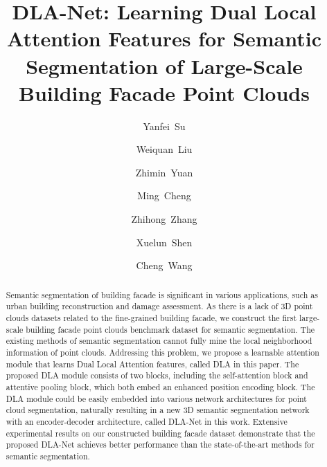 \documentclass[review]{elsarticle}
\begin{document}
\begin{frontmatter}

\title{DLA-Net: Learning Dual Local Attention Features for Semantic Segmentation of Large-Scale Building Facade Point Clouds}

\author[mymainaddress]{Yanfei~Su}
\author[mymainaddress]{Weiquan~Liu}
\author[mymainaddress]{Zhimin~Yuan}
\author[mymainaddress]{Ming~Cheng}
\author[mymainaddress]{Zhihong~Zhang}
\author[mymainaddress]{Xuelun~Shen}
\author[mymainaddress]{Cheng~Wang}

\address[mymainaddress]{Fujian Key Laboratory of Sensing and Computing for Smart City, School of Informatics, Xiamen University, Xiamen, China}



\begin{abstract}
	
Semantic segmentation of building facade is significant in various applications, such as urban building reconstruction and damage assessment. As there is a lack of 3D point clouds datasets related to the fine-grained building facade, we construct the first large-scale building facade point clouds benchmark dataset for semantic segmentation. The existing methods of semantic segmentation cannot fully mine the local neighborhood information of point clouds. Addressing this problem, we propose a learnable attention module that learns Dual Local Attention features, called DLA in this paper. The proposed DLA module consists of two blocks, including the self-attention block and attentive pooling block, which both embed an enhanced position encoding block. The DLA module could be easily embedded into various network architectures for point cloud segmentation, naturally resulting in a new 3D semantic segmentation network with an encoder-decoder architecture, called DLA-Net in this work. Extensive experimental results on our constructed building facade dataset demonstrate that the proposed DLA-Net achieves better performance than the state-of-the-art methods for semantic segmentation.
	

\end{abstract}
\end{frontmatter}
\end{document}

